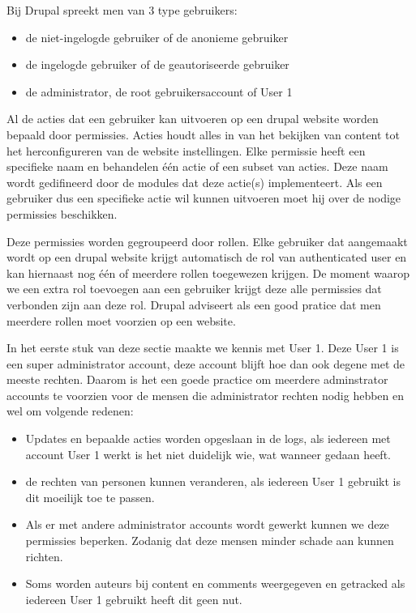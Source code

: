 Bij Drupal spreekt men van 3 type gebruikers:
\begin{itemize}
	\item de niet-ingelogde gebruiker of de anonieme gebruiker
	\item de ingelogde gebruiker of de geautoriseerde gebruiker
	\item de administrator, de root gebruikersaccount of User 1
\end{itemize}

Al de acties dat een gebruiker kan uitvoeren op een drupal website worden bepaald door permissies. Acties houdt alles in van het bekijken van content tot het herconfigureren van de website instellingen. Elke permissie heeft een specifieke naam en behandelen één actie of een subset van acties. Deze naam wordt gedifineerd door de modules dat deze actie(s) implementeert. Als een gebruiker dus een specifieke actie wil kunnen uitvoeren moet hij over de nodige permissies beschikken.

Deze permissies worden gegroupeerd door rollen. Elke gebruiker dat aangemaakt wordt op een drupal website krijgt automatisch de rol van authenticated user en kan hiernaast nog één of meerdere rollen toegewezen krijgen. De moment waarop we een extra rol toevoegen aan een gebruiker krijgt deze alle permissies dat verbonden zijn aan deze rol. Drupal adviseert als een good pratice dat men meerdere rollen moet voorzien op een website.

In het eerste stuk van deze sectie maakte we kennis met User 1. Deze User 1 is een super administrator account, deze account blijft hoe dan ook degene met de meeste rechten. Daarom is het een goede practice om meerdere adminstrator accounts te voorzien voor de mensen die administrator rechten nodig hebben en wel om volgende redenen:

\begin{itemize}
	\item Updates en bepaalde acties worden opgeslaan in de logs, als iedereen met account User 1 werkt is het niet duidelijk wie, wat wanneer gedaan heeft.
	\item de rechten van personen kunnen veranderen, als iedereen User 1 gebruikt is dit moeilijk toe te passen.
	\item Als er met andere administrator accounts wordt gewerkt kunnen we deze permissies beperken. Zodanig dat deze mensen minder schade aan kunnen richten.
	\item Soms worden auteurs bij content en comments weergegeven en getracked als iedereen User 1 gebruikt heeft dit geen nut.
\end{itemize}
 

